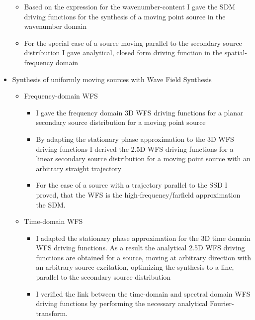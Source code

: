 \documentclass[a4paper,10pt]{article}
\begin{document}
\begin{itemize}
\begin{itemize}
	\item Based on the expression for the wavenumber-content I gave the SDM driving functions for the synthesis of a moving point source in the wavenumber domain
	\item For the special case of a source moving parallel to the secondary source distribution I gave analytical, closed form driving function in the spatial-frequency domain
	\end{itemize}
\item Synthesis of uniformly moving sources with Wave Field Synthesis
	\begin{itemize}
	\item Frequency-domain WFS
		\begin{itemize}
		\item I gave the frequency domain 3D WFS driving functions for a planar secondary source distribution for a moving point source
		\item By adapting the stationary phase approximation to the 3D WFS driving functions I derived the 2.5D WFS driving functions for a linear secondary source distribution for a moving point source with an arbitrary straight trajectory
		\item For the case of a source with a trajectory parallel to the SSD I proved, that the WFS is the high-frequency/farfield approximation the SDM.
		\end{itemize}
	\item Time-domain WFS
		\begin{itemize}
		\item I adapted the stationary phase approximation for the 3D time domain WFS driving functions. As a result the analytical 2.5D WFS driving functions are obtained for a source, 	moving at arbitrary direction with an arbitrary source excitation, optimizing the synthesis to a line, parallel to the secondary source distribution
		\item I verified the link between the time-domain and spectral domain WFS driving functions by performing the necessary analytical Fourier-transform.
		\end{itemize}
	\end{itemize}
\end{itemize}
\end{document}
